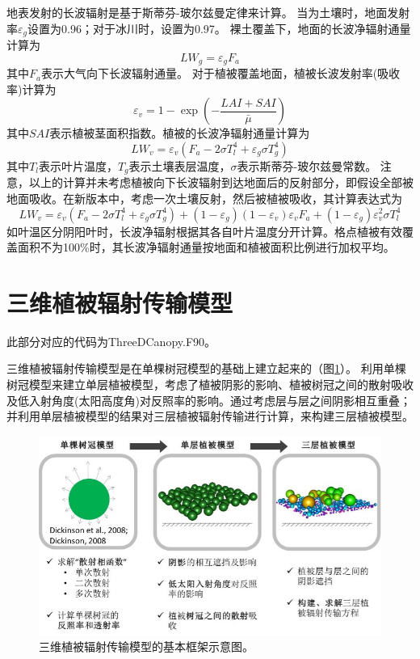地表发射的长波辐射是基于斯蒂芬-玻尔兹曼定律来计算。
当为土壤时，地面发射率$\varepsilon_g$设置为0.96；对于冰川时，设置为0.97。
裸土覆盖下，地面的长波净辐射通量计算为
\begin{equation}
L W_{g}=\varepsilon_{g} F_{a}
\end{equation}
其中$F_a$表示大气向下长波辐射通量。
对于植被覆盖地面，植被长波发射率(吸收率)计算为
\begin{equation}
\varepsilon_{v}=1-\exp \left(-\frac{LAI+SAI}{\bar{\mu}}\right)
\end{equation}
其中$SAI$表示植被茎面积指数。植被的长波净辐射通量计算为
\begin{equation}
L W_{v}=\varepsilon_{v}\left(F_{a}-2 \sigma T_{l}^{4}+\varepsilon_{g} \sigma T_{g}^{4}\right)
\end{equation}
其中$T_l$表示叶片温度，$T_g$表示土壤表层温度，$\sigma$表示斯蒂芬-玻尔兹曼常数。
注意，以上的计算并未考虑植被向下长波辐射到达地面后的反射部分，即假设全部被地面吸收。在新版本中，考虑一次土壤反射，然后被植被吸收，其计算表达式为
\begin{equation}
L W_{v}=\varepsilon_{v}\left(F_{a}-2 \sigma T_{l}^{4}+\varepsilon_{g} \sigma T_{g}^{4}\right)+\left(1-\varepsilon_{g}\right)\left(1-\varepsilon_{v}\right) \varepsilon_{v} F_{a}+\left(1-\varepsilon_{g}\right) \varepsilon_{v}^{2} \sigma T_{l}^{4}
\end{equation}
如叶温区分阴阳叶时，长波净辐射根据其各自叶片温度分开计算。格点植被有效覆盖面积不为100\%时，其长波净辐射通量按地面和植被面积比例进行加权平均。

\section{三维植被辐射传输模型}\label{三维植被辐射传输模型}
此部分对应的代码为ThreeDCanopy.F90。

三维植被辐射传输模型\citep{yuan20143d}是在单棵树冠模型\citep{dickinson2008determination,dickinson2008three}的基础上建立起来的（图\ref{fig:三维植被辐射传输模型的基本框架}）。
利用单棵树冠模型来建立单层植被模型，考虑了植被阴影的影响、植被树冠之间的散射吸收及低入射角度(太阳高度角)对反照率的影响。通过考虑层与层之间阴影相互重叠；
并利用单层植被模型的结果对三层植被辐射传输进行计算，来构建三层植被模型。
{
\begin{figure}[]
\centering
\includegraphics{Figures/辐射过程及辐射通量计算/三维植被辐射传输模型的基本框架.png}
\caption{三维植被辐射传输模型的基本框架示意图。}
\label{fig:三维植被辐射传输模型的基本框架}
\end{figure}
}


